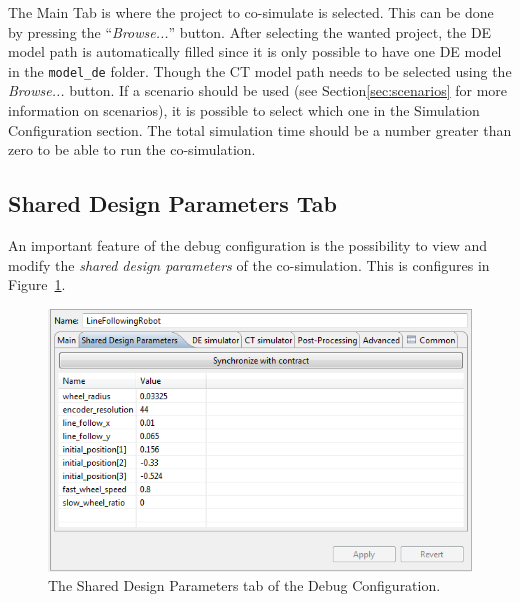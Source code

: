 \documentclass{crescendorepchap}
\begin{document}

%

The Main Tab is where the project to co-simulate is selected. This can
be done by pressing the ``\emph{Browse...}'' button. After selecting the
wanted project, the DE model path is automatically filled
since it is only possible to have one DE model in the \texttt{model\_de}
folder. Though the CT model path needs to be selected using the \emph{Browse...}
button. If a scenario should be used (see Section\ref{sec:scenarios} for more information on scenarios), it is possible
to select which one in the Simulation Configuration section. The total
simulation time should be a number greater than zero to be able to run
the co-simulation.

\subsection{Shared Design Parameters Tab}

An important feature of the debug configuration is the possibility to
view and modify the \emph{shared design
parameters} of the co-simulation. This is configures in Figure~\ref{fig:sdpindebug}. 

\begin{figure}[htbp]
\centering
\includegraphics[width=.6\textwidth]{images/DestecsDebugConfigurationSDP.png}
\caption{The Shared Design Parameters tab of the Debug Configuration.\label{fig:sdpindebug}}
\end{figure}
\end{document}
